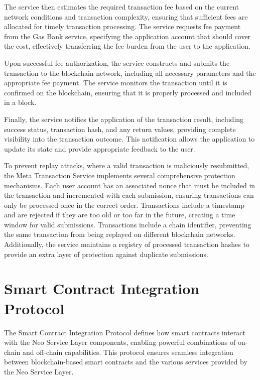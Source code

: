\documentclass[11pt]{article}
\begin{document}
The service then estimates the required transaction fee based on the current network conditions and transaction complexity, ensuring that sufficient fees are allocated for timely transaction processing. The service requests fee payment from the Gas Bank service, specifying the application account that should cover the cost, effectively transferring the fee burden from the user to the application.

Upon successful fee authorization, the service constructs and submits the transaction to the blockchain network, including all necessary parameters and the appropriate fee payment. The service monitors the transaction until it is confirmed on the blockchain, ensuring that it is properly processed and included in a block.

Finally, the service notifies the application of the transaction result, including success status, transaction hash, and any return values, providing complete visibility into the transaction outcome. This notification allows the application to update its state and provide appropriate feedback to the user.

To prevent replay attacks, where a valid transaction is maliciously resubmitted, the Meta Transaction Service implements several comprehensive protection mechanisms. Each user account has an associated nonce that must be included in the transaction and incremented with each submission, ensuring transactions can only be processed once in the correct order. Transactions include a timestamp and are rejected if they are too old or too far in the future, creating a time window for valid submissions. Transactions include a chain identifier, preventing the same transaction from being replayed on different blockchain networks. Additionally, the service maintains a registry of processed transaction hashes to provide an extra layer of protection against duplicate submissions.

\section{Smart Contract Integration Protocol}
\label{subsec:smart-contract-protocol-spec}

The Smart Contract Integration Protocol defines how smart contracts interact with the Neo Service Layer components, enabling powerful combinations of on-chain and off-chain capabilities. This protocol ensures seamless integration between blockchain-based smart contracts and the various services provided by the Neo Service Layer.
\end{document}
